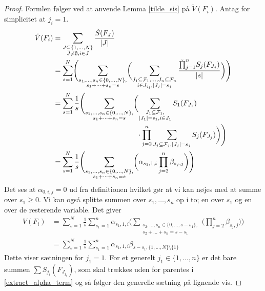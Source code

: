 \documentclass[a4paper, 12pt]{article}
\begin{document}
\begin{proof}
Formlen følger ved at anvende Lemma \ref{tilde_sis} på $\tilde V(F_i)$. Antag for simplicitet at $j_i=1$.
\begin{align}
\tilde V(F_i)&=\sum_{\substack{J\subseteq\{1,\dots, N\}\\ J\neq \emptyset, i\in J}} \frac{\tilde S(F_J)}{|J|}\nonumber\\
&=\sum_{s=1}^{N} \Biggl(\sum_{\substack{s_1, \dots, s_n\in \{0, \dots, N\},\\
s_1+\dots+s_n=s}}\biggl(\sum_{\substack{J_1\subseteq \mathcal F_1, \dots, J_n\subseteq \mathcal F_n\\
i\in J_{j_i}, |J_j|=s_j}} \frac{\tilde \prod_{j=1}^nS_j(F_{J_j})}{|s|}\biggr)\Biggr)\nonumber\\
&=\sum_{s=1}^{N}\frac{1}{s} \Biggl(\sum_{\substack{s_1, \dots, s_n\in \{0, \dots, N\},\\
s_1+\dots+s_n=s}}\biggl(\begin{lgathered}[t]\sum_{\substack{J_1\subseteq \mathcal F_1,\\|J_1|=s_1, i\in J_1}}S_1(F_{J_1})\\
\cdot \prod_{j=2}^n \sum_{\substack{J_j\subseteq \mathcal F_j,|J_j|=s_j}} S_j(F_{J_j})\biggr)\Biggr)\end{lgathered}\label{extract_alpha_term}\\
&=\sum_{s=1}^{N}\frac{1}{s} \Biggl(\sum_{\substack{s_1, \dots, s_n\in \{0, \dots, N\},\\
s_1+\dots+s_n=s}}\biggl(\alpha_{s_1, 1,i} \prod_{j=2}^n \beta_{s_j,j}\biggr)\Biggr)\nonumber
\end{align}
Det ses at $\alpha_{0,i,j}=0$ ud fra definitionen hvilket gør at vi kan nøjes med at summe over $s_1\geq 0$. Vi kan også splitte summen over $s_1, \dots, s_n$ op i to; en over $s_1$ og en over de resterende variable. Det giver
\begin{align*}
V(F_i)&=\sum_{s=1}^{N}\frac{1}{s}\sum_{s_1=1}^n \alpha_{s_1, 1,i}  \Biggl(\sum_{\substack{s_2, \dots, s_n\in \{0,\dots, s-s_1\},\\ s_2+\dots+s_n=s-s_1}}\biggl( \prod_{j=2}^n \beta_{s_j,j}\biggr)\Biggr)\\
&=\sum_{s=1}^{N}\frac{1}{s}\sum_{s_1=1}^n \alpha_{s_1, 1,i} \beta_{s-s_1, \{1, \dots, N\}\setminus \{1\}}
\end{align*}
Dette viser sætningen for $j_1=1$. For et generelt $j_1\in \{1, \dots, n\}$ er det bare summen $\sum S_{j_i}(F_{J_{j_i}})$, som skal trækkes uden for parentes i \eqref{extract_alpha_term} og så følger den generelle sætning på lignende vis. 
\end{proof}
\end{document}

